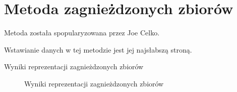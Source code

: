 \section{Metoda zagnieżdzonych zbiorów}

Metoda została spopularyzowana przez Joe Celko\cite{celkosql}.






Wstawianie danych w tej metodzie jest jej najsłabszą stroną.








\begin{table}[h!]
  \caption{Wyniki reprezentacji zagnieżdzonych zbiorów}
   \begin{center}
   \end{center}
\end{table}

\begin{figure}[h!t]
  \caption{Wyniki reprezentacji zagnieżdzonych zbiorów}
  \label{fig:img_chart_nested}
  \begin{center}
  \end{center}
\end{figure}

